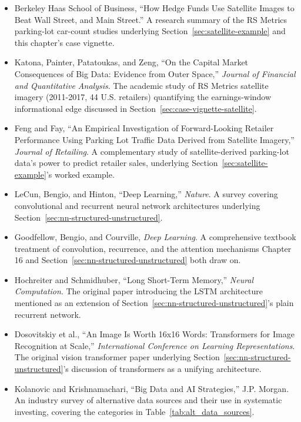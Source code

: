 \documentclass[../ai_in_finance]{subfiles}
\begin{document}
\begin{itemize}
    \item Berkeley Haas School of Business, ``How Hedge Funds Use Satellite Images to Beat Wall Street, and Main Street.'' A research summary of the RS Metrics parking-lot car-count studies underlying Section~\ref{sec:satellite-example} and this chapter's case vignette.
    \item Katona, Painter, Patatoukas, and Zeng, ``On the Capital Market Consequences of Big Data: Evidence from Outer Space,'' \emph{Journal of Financial and Quantitative Analysis}. The academic study of RS Metrics satellite imagery (2011-2017, 44 U.S. retailers) quantifying the earnings-window informational edge discussed in Section~\ref{sec:case-vignette-satellite}.
    \item Feng and Fay, ``An Empirical Investigation of Forward-Looking Retailer Performance Using Parking Lot Traffic Data Derived from Satellite Imagery,'' \emph{Journal of Retailing}. A complementary study of satellite-derived parking-lot data's power to predict retailer sales, underlying Section~\ref{sec:satellite-example}'s worked example.
    \item LeCun, Bengio, and Hinton, ``Deep Learning,'' \emph{Nature}. A survey covering convolutional and recurrent neural network architectures underlying Section~\ref{sec:nn-structured-unstructured}.
    \item Goodfellow, Bengio, and Courville, \emph{Deep Learning}. A comprehensive textbook treatment of convolution, recurrence, and the attention mechanisms Chapter 16 and Section~\ref{sec:nn-structured-unstructured} both draw on.
    \item Hochreiter and Schmidhuber, ``Long Short-Term Memory,'' \emph{Neural Computation}. The original paper introducing the LSTM architecture mentioned as an extension of Section~\ref{sec:nn-structured-unstructured}'s plain recurrent network.
    \item Dosovitskiy et al., ``An Image Is Worth 16x16 Words: Transformers for Image Recognition at Scale,'' \emph{International Conference on Learning Representations}. The original vision transformer paper underlying Section~\ref{sec:nn-structured-unstructured}'s discussion of transformers as a unifying architecture.
    \item Kolanovic and Krishnamachari, ``Big Data and AI Strategies,'' J.P. Morgan. An industry survey of alternative data sources and their use in systematic investing, covering the categories in Table~\ref{tab:alt_data_sources}.

\end{itemize}
\end{document}
